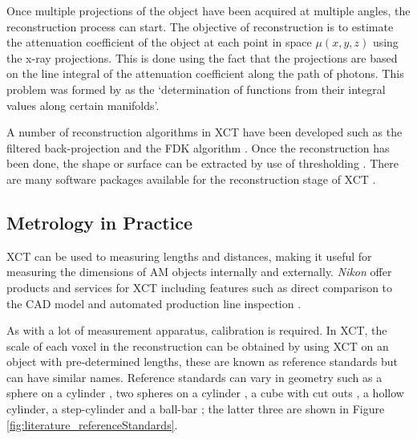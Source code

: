 Once multiple projections of the object have been acquired at multiple angles, the reconstruction process can start. The objective of reconstruction is to estimate the attenuation coefficient of the object at each point in space $\mu(x,y,z)$ using the x-ray projections. This is done using the fact that the projections are based on the line integral of the attenuation coefficient along the path of photons. This problem was formed by \cite{radon1986on} as the `determination of functions from their integral values along certain manifolds'.

A number of reconstruction algorithms in XCT have been developed \citep{smith1990cone} such as the filtered back-projection \citep{brooks1976principles} and the FDK algorithm \citep{feldkamp1984practical}. Once the reconstruction has been done, the shape or surface can be extracted by use of thresholding \citep{kruth2011computed}. There are many software packages available for the reconstruction stage of XCT \citep{reinhart2008industrial, sun2012overview}.

\subsection{Metrology in Practice}

XCT can be used to measuring lengths and distances, making it useful for measuring the dimensions of AM objects internally and externally. \emph{Nikon} offer products and services for XCT including features such as direct comparison to the CAD model \citep{nikon2015microfocus, nikon2018mct225} and automated production line inspection \citep{nikon2015inline, nikon2018automated}.

As with a lot of measurement apparatus, calibration is required. In XCT, the scale of each voxel in the reconstruction can be obtained by using XCT on an object with pre-determined lengths, these are known as reference standards \citep{bartscher2007enhancement} but can have similar names. Reference standards can vary in geometry such as a sphere on a cylinder \citep{lifton2013application}, two spheres on a cylinder \citep{sun2016reference}, a cube with cut outs \citep{kiekens2011test}, a hollow cylinder, a step-cylinder and a ball-bar \citep{bartscher2007enhancement}; the latter three are shown in Figure \ref{fig:literature_referenceStandards}.

